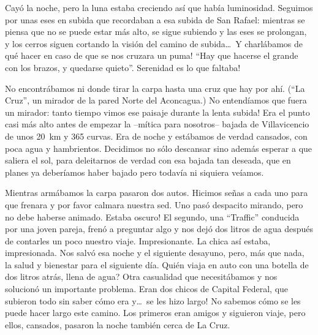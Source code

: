 Cay\'o la noche, pero la luna estaba creciendo as\'i que hab\'ia luminosidad.
Seguimos por unas eses en subida que recordaban a esa subida de San Rafael:
mientras se piensa que no se puede estar m\'as alto, se sigue subiendo y las
eses se prolongan, y los cerros siguen cortando la visi\'on del camino de
subida\ldots\ \textexclamdown Y charl\'abamos de qu\'e hacer en caso de que se
nos cruzara un puma! ``Hay que hacerse el grande con los brazos, y quedarse
quieto''. \textexclamdown Serenidad es lo que faltaba!

No encontr\'abamos ni donde tirar la carpa hasta una cruz que hay por ah\'i.
(``La Cruz'', un mirador de la pared Norte del Aconcagua.) No entend\'iamos
que fuera un mirador: \textexclamdown tanto tiempo vimos ese paisaje durante la
lenta subida! Era el punto casi m\'as alto antes de empezar la --m\'itica para
nosotros-- bajada de Villavicencio de unos 20~km y 365 curvas. Era de noche y
est\'abamos de verdad cansados, con poca agua y hambrientos. Decidimos no s\'olo
descansar sino adem\'as esperar a que saliera el sol, para deleitarnos de verdad
con esa bajada tan deseada, que en planes ya deber\'iamos haber bajado pero
todav\'ia ni siquiera ve\'iamos.

Mientras arm\'abamos la carpa pasaron dos autos. Hicimos se\~nas a cada uno para
que frenara y por favor calmara nuestra sed. Uno pas\'o despacito mirando, pero
no debe haberse animado. \textexclamdown Estaba oscuro! El segundo, una
``Traffic'' conducida por una joven pareja, fren\'o a preguntar algo y nos
dej\'o dos litros de agua despu\'es de contarles un poco nuestro viaje.
Impresionante. La chica as\'i estaba, impresionada. Nos salv\'o esa noche y el
siguiente desayuno, pero, m\'as que nada, la salud y bienestar para el siguiente
d\'ia. \textquestiondown Qui\'en viaja en auto con una botella de dos litros
atr\'as, llena de agua? Otra casualidad que necesit\'abamos y nos solucion\'o un
importante problema. Eran dos chicos de Capital Federal, que subieron todo sin
saber c\'omo era y\ldots\ \textexclamdown se les hizo largo! No sabemos c\'omo
se les puede hacer largo este camino. Los primeros eran amigos y siguieron
viaje, pero ellos, cansados, pasaron la noche tambi\'en cerca de La Cruz.

